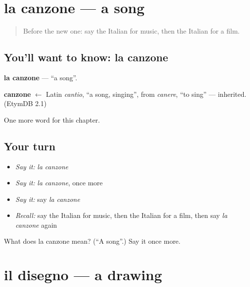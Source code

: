 \section[la canzone]{la canzone — a song}

\label{lesson:IT-C116-canzone}



\begin{quote}
Before the new one: say the Italian for music, then the Italian for a film.
\end{quote}

\subsection*{You'll want to know: la canzone}
\textbf{la canzone} — \textquotedblleft{}a song\textquotedblright{}.

\begin{cousinweb}
\textbf{canzone} $\leftarrow$ Latin \emph{cantio}, \textquotedblleft{}a song, singing\textquotedblright{}, from \emph{canere}, \textquotedblleft{}to sing\textquotedblright{} — inherited. (EtymDB 2.1)
\end{cousinweb}

\begin{grammarlens}[title={What you've built}]
One more word for this chapter.
\end{grammarlens}

\subsection*{Your turn}
\begin{itemize}
\raggedright
  \item \emph{Say it:} \emph{la canzone}
  \item \emph{Say it:} \emph{la canzone}, once more
  \item \emph{Say it:} say \emph{la canzone}
  \item \emph{Recall:} say the Italian for music, then the Italian for a film, then say \emph{la canzone} again
\end{itemize}

\begin{tcolorbox}[breakable,colback=teal!4,colframe=teal!35!black,title={Before you move on}]
What does la canzone mean? (\textquotedblleft{}A song\textquotedblright{}.) Say it once more.
\end{tcolorbox}
\section[il disegno]{il disegno — a drawing}

